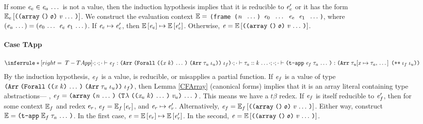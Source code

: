 \begin{sproof}
  If some $\mathit{e}_e \in \mathit{e}_a \, \ldots \,$ is not a value,
  then the induction hypothesis implies that
  it is reducible to $\mathit{e}_e'$
  or it has the form $\ctxt_e\left[\misapp\right]$.
  We construct the evaluation context
  $\mathbb{E} =$
  {\tt (frame ($\mathit{n}$ $\, \ldots \,$)
    $\mathit{e}_0$ $\, \ldots \,$ $\mathit{e}_e$ $\mathit{e}_1$ $\, \ldots \,$)},
  where $\left( \mathit{e}_a \, \ldots \, \right) = \left( \mathit{e}_0 \, \ldots \, \; \mathit{e}_e \; \mathit{e}_1 \, \ldots \, \right)$.
  If $\mathit{e}_e \mapsto \mathit{e}_e'$, then $\mathbb{E}\left[\mathit{e}_e\right] \mapsto \mathbb{E}\left[\mathit{e}_e'\right]$.
  Otherwise, $\expr = \ctxt\left[\misapp\right]$.

  \paragraph{Case {\sc TApp}}
  \[{\infr[T-TApp]
    {\typeof{\emptyEnv}{\emptyEnv}{\emptyEnv}
      {\expr_f}
      {\typearray{\typeuniv{\sequence{\notevar{\var}{\kind}}}{\typearray{\type_u}{\idx_u}}}{\idx_f}}
      \\\\
    \sequence{\kindof{\emptyEnv}{\emptyEnv}{\type_a}{\kind}}}
    {\typeof{\emptyEnv}{\emptyEnv}{\emptyEnv}
      {\tapp{\expr_f}{\sequence{\type_a}}}
      {\typearray{\seqsubst{\type_u}{\var}{\type_a}}{\idxappend{\idx_f \; \idx_u}}}}}\]
  By the induction hypothesis,
  $\mathit{e}_f$ is a value, is reducible, or misapplies a partial function.
  If $\mathit{e}_f$ is a value of type
  ${\typearray{\typeuniv{\sequence{\notevar{\var}{\kind}}}{\typearray{\type_u}{\idx_u}}}{\idx_f}}$,
  then Lemma \ref{CFArray} (canonical forms) implies
  that it is an array literal containing type abstractions---%
  \ie, $\expr_f = \arrlit{\sequence{{\tlam{\sequence{\notevar{\var_u}{\kind}}}{\val_u}}}}{\sequence{\nat}}$.
  This means we have a $\mathit{t\beta}$ redex.%
  If $\mathit{e}_f$ is itself reducible to $\mathit{e}_f'$,
  then for some context $\mathbb{E}_f$ and redex $\mathit{e}_r$,
  $\mathit{e}_f = \mathbb{E}_f\left[\mathit{e}_r\right]$, and $\mathit{e}_r \mapsto \mathit{e}_r'$.
  Alternatively, $\expr_f = \ctxt_f\left[\misapp\right]$.
  Either way, construct $\ctxt = \tapp{\ctxt_f}{\sequence{\type_a}}$.
  In the first case, $\mathit{e} = \mathbb{E}\left[\mathit{e}_r\right] \mapsto \mathbb{E}\left[\mathit{e}_r'\right]$.
  In the second, $\expr = \ctxt\left[\misapp\right]$.

\end{sproof}
